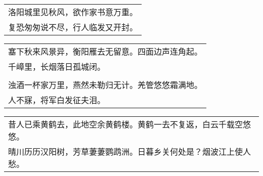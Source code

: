 \nopagebreak%
\nopagebreak%
\noindent\begin{minipage}{\linewidth}
  \vskip-3pt\begin{table}[H]
    \centering
    \begin{tabular}{@{}l@{}}
洛阳城里见秋风，欲作家书意万重。\\
复恐匆匆说不尽，行人临发又开封。
    \end{tabular}
  \end{table}
\end{minipage}
\vspace{1cm}


\nopagebreak%
\nopagebreak%
\noindent\begin{minipage}{\linewidth}
  \vskip-3pt\begin{table}[H]
    \centering
    \begin{tabular}{@{}l@{}}
塞下秋来风景异，衡阳雁去无留意。四面边声连角起。\\
千嶂里，长烟落日孤城闭。\\
\\
浊酒一杯家万里，燕然未勒归无计。羌管悠悠霜满地。\\
人不寐，将军白发征夫泪。
    \end{tabular}
  \end{table}
\end{minipage}
\vspace{1cm}


\nopagebreak%
\nopagebreak%
\noindent\begin{minipage}{\linewidth}
  \vskip-3pt\begin{table}[H]
    \centering
    \begin{tabular}{@{}l@{}}
昔人已乘黄鹤去，此地空余黄鹤楼。黄鹤一去不复返，白云千载空悠悠。\\
晴川历历汉阳树，芳草萋萋鹦鹉洲。日暮乡关何处是？烟波江上使人愁。
    \end{tabular}
  \end{table}
\end{minipage}
\vspace{1cm}


